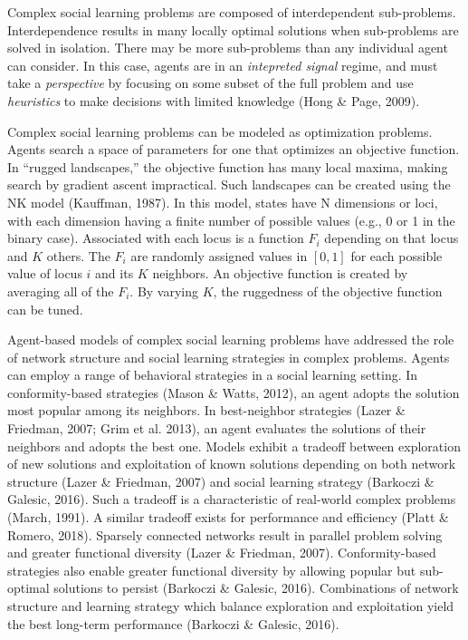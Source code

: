 Complex social learning problems are composed of interdependent sub-problems.
Interdependence results in many locally optimal solutions when sub-problems are
solved in isolation.
There may be more sub-problems than any individual agent can consider.
In this case, agents are in an {\em intepreted signal} regime, and must take a {\em perspective} by focusing on some subset of the full
problem and use {\em heuristics} to make decisions with limited knowledge (Hong \& Page, 2009).

Complex social learning problems can be modeled as optimization problems. Agents search a space of parameters for one that optimizes an objective function. In ``rugged landscapes,'' the objective function has many local maxima, making search by gradient ascent impractical. Such landscapes can be created using the NK model (Kauffman, 1987). In this model, states have N dimensions or loci, with each dimension having a finite number of possible values (e.g., 0 or 1 in the binary case). Associated with each locus is a function $F_i$ depending on that locus and $K$ others. The $F_i$ are randomly assigned values in $[0,1]$ for each possible value of locus $i$ and its $K$ neighbors. An objective function is created by averaging all of the $F_i$. By varying $K$, the ruggedness of the objective function can be tuned.

Agent-based models of complex social learning problems have addressed the role of network structure and social learning strategies in complex problems. Agents can employ a range of behavioral strategies in a social learning setting. In conformity-based strategies (Mason \& Watts, 2012), an agent adopts the solution most popular among its neighbors. In best-neighbor strategies (Lazer \& Friedman, 2007; Grim et al. 2013), an agent evaluates the solutions of their neighbors and adopts the best one. Models exhibit a tradeoff between exploration of new solutions and exploitation of known solutions depending on both network structure (Lazer \& Friedman, 2007) and social learning strategy (Barkoczi \& Galesic, 2016). Such a tradeoff is a characteristic of real-world complex problems (March, 1991). A similar tradeoff exists for performance and efficiency (Platt \& Romero, 2018). Sparsely connected networks result in parallel problem solving and greater functional diversity (Lazer \& Friedman, 2007). Conformity-based strategies also enable greater functional diversity by allowing popular but sub-optimal solutions to persist (Barkoczi \& Galesic, 2016). Combinations of network structure and learning strategy which balance exploration and exploitation yield the best long-term performance (Barkoczi \& Galesic, 2016).

